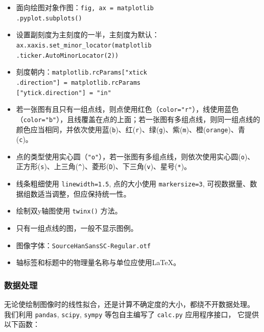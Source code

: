 \begin{itemize}
  \item 面向绘图对象作图：\verb|fig, ax = matplotlib|\\\verb|.pyplot.subplots()|
  \item 设置副刻度为主刻度的一半，主刻度为默认：\verb|ax.xaxis.set_minor_locator(matplotlib|\\\verb|.ticker.AutoMinorLocator(2))|
  \item 刻度朝内：\verb|matplotlib.rcParams["xtick|\\\verb|.direction"] = matplotlib.rcParams|\\\verb|["ytick.direction"] = "in"|
  \item 若一张图有且只有一组点线，则点使用红色（\verb|color="r"|），线使用蓝色（\verb|color="b"|），且线覆盖在点的上面；若一张图有多组点线，则同一组点线的颜色应当相同，并依次使用蓝(\verb|b|)、红(\verb|r|)、绿(\verb|g|)、紫(\verb|m|)、橙(\verb|orange|)、青(\verb|c|)。
  \item 点的类型使用实心圆（\verb|"o"|），若一张图有多组点线，则依次使用实心圆(\verb|o|)、正方形(\verb|s|)、上三角(\verb|^|)、菱形(\verb|D|)、下三角(\verb|v|)、星号(\verb|*|)。
  \item 线条粗细使用 \verb|linewidth=1.5|, 点的大小使用 \verb|markersize=3|, 可视数据量、数据组数适当调整，但应保持统一性。
  \item 绘制双y轴图使用 \verb|twinx()| 方法。
  \item 只有一组点线的图，一般不显示图例。
  \item 图像字体：\verb|SourceHanSansSC-Regular.otf|
  \item 轴标签和标题中的物理量名称与单位应使用\LaTeX。
\end{itemize}

\subsubsection{数据处理}

无论使绘制图像时的线性拟合，还是计算不确定度的大小，都绕不开数据处理。
我们利用 \verb|pandas|, \verb|scipy|, \verb|sympy| 等包自主编写了 \verb|calc.py| 应用程序接口，
它提供以下函数：

